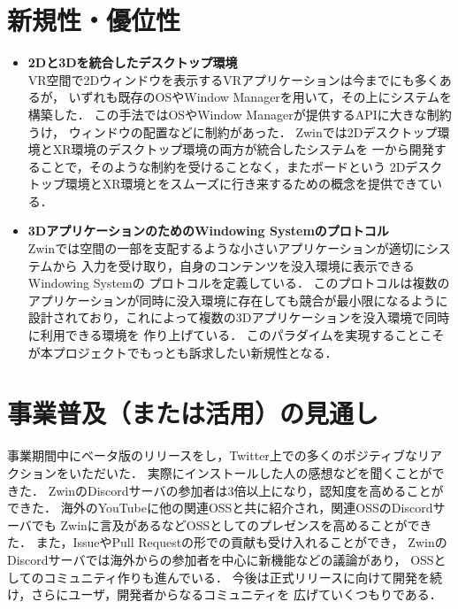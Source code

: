 \documentclass[12pt,a4paper]{jsarticle}
\begin{document}
\section{新規性・優位性}

\begin{itemize}
  \item \textbf{2Dと3Dを統合したデスクトップ環境} \\
        VR空間で2Dウィンドウを表示するVRアプリケーションは今までにも多くあるが，
        いずれも既存のOSやWindow Managerを用いて，その上にシステムを構築した．
        この手法ではOSやWindow Managerが提供するAPIに大きな制約うけ，
        ウィンドウの配置などに制約があった．
        Zwinでは2Dデスクトップ環境とXR環境のデスクトップ環境の両方が統合したシステムを
        一から開発することで，そのような制約を受けることなく，またボードという
        2Dデスクトップ環境とXR環境とをスムーズに行き来するための概念を提供できている．
  \item \textbf{3DアプリケーションのためのWindowing Systemのプロトコル} \\
        Zwinでは空間の一部を支配するような小さいアプリケーションが適切にシステムから
        入力を受け取り，自身のコンテンツを没入環境に表示できるWindowing Systemの
        プロトコルを定義している．
        このプロトコルは複数のアプリケーションが同時に没入環境に存在しても競合が最小限になるように
        設計されており，これによって複数の3Dアプリケーションを没入環境で同時に利用できる環境を
        作り上げている．
        このパラダイムを実現することこそが本プロジェクトでもっとも訴求したい新規性となる．
\end{itemize}

\section{事業普及（または活用）の見通し}

事業期間中にベータ版のリリースをし，Twitter上での多くのポジティブなリアクションをいただいた．
実際にインストールした人の感想などを聞くことができた．
ZwinのDiscordサーバの参加者は3倍以上になり，認知度を高めることができた．
海外のYouTubeに他の関連OSSと共に紹介され，関連OSSのDiscordサーバでも
Zwinに言及があるなどOSSとしてのプレゼンスを高めることができた．
また，IssueやPull Requestの形での貢献も受け入れることができ，
ZwinのDiscordサーバでは海外からの参加者を中心に新機能などの議論があり，
OSSとしてのコミュニティ作りも進んでいる．
今後は正式リリースに向けて開発を続け，さらにユーザ，開発者からなるコミュニティを
広げていくつもりである．
\end{document}

